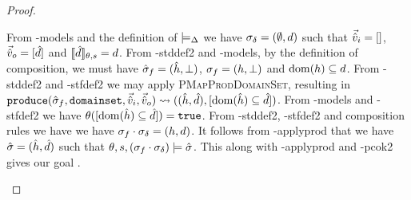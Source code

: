 \begin{proof}
\begin{hypvlist}
 From \hyp{models} and the definition of $\models_{\Delta}$ we have $\sigma_\delta=(\emptyset,d)$ such that $\vec{\hat{v}}_i=[]$, $\vec{\hat{v}}_o=[\hat{d}]$ and $\llbracket\hat{d}\rrbracket_{\theta,s}=d$.
 From \hyp{stddef2} and \hyp{models}, by the definition of composition, we must have $\hat{\sigma}_f=(\hat{h},\bot)$, $\sigma_f=(h,\bot)$ and $\operatorname{dom}(h)\subseteq d$.
 From \hyp{stddef2} and \hyp{stfdef2} we may apply \textsc{PMapProdDomainSet}, resulting in $\\\texttt{produce}(\hat{\sigma}_f,\texttt{domainset},\vec{\hat{v}}_i,\vec{\hat{v}}_o)\rightsquigarrow ((\hat{h}, \hat{d}), [\operatorname{dom}(\hat{h})\subseteq \hat{d}])$.
 From \hyp{models} and \hyp{stfdef2} we have $\theta([\operatorname{dom}(\hat{h})\subseteq \hat{d}])=\texttt{true}$.
 From \hyp{stddef2}, \hyp{stfdef2} and composition rules we have we have $\sigma_f\cdot\sigma_\delta=(h,d)$. It follows from \hyp{applyprod} that we have $\hat{\sigma}=(\hat{h},\hat{d})$ such that $\theta,s,(\sigma_f\cdot\sigma_\delta)\models\hat{\sigma}$. This along with \hyp{applyprod} and \hyp{pcok2} gives our goal .
\end{hypvlist}

\end{proof}

